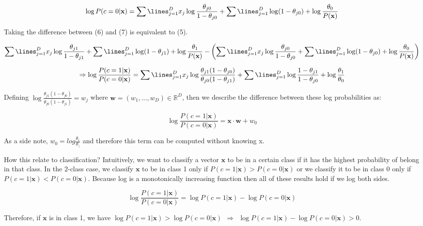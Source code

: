 \begin{equation}
\log P(c = 0 | \mathbf{x}) = \sum\lines_{j=1}^D x_j \log \frac{ \theta_{j0}}{1 - \theta_{j0}} + \sum\lines_{j=1}^D \log(1 - \theta_{j0}) +  \log \frac{\theta_0}{P(\mathbf{x})} 
\end{equation}

Taking the difference between (6) and (7) is equivalent to (5). 

$$
\sum\lines_{j=1}^D x_j \log \frac{ \theta_{j1}}{1 - \theta_{j1}} + 
\sum\lines_{j=1}^D \log(1 - \theta_{j1}) +  \log \frac{\theta_1}{P(\mathbf{x})} - \left( \sum\lines_{j=1}^D x_j \log \frac{ \theta_{j0}}{1 - \theta_{j0}} + \sum\lines_{j=1}^D \log(1 - \theta_{j0}) +  \log \frac{\theta_0}{P(\mathbf{x})} \right)
$$

$$
\Rightarrow \log \frac{  P( c = 1 | \mathbf{x})}{P( c = 0 | \mathbf{x})} = 
\sum\lines_{j=1}^D x_j \log \frac{ \theta_{j1} ( 1 - \theta_{j0}) }{ \theta_{j0}  (1 - \theta_{j1} ) } + 
\sum\lines_{j=1}^D \log \frac{ 1 - \theta_{j1} }{ 1 - \theta_{j0}  } +
 \log \frac{\theta_1}{\theta_0}
$$

Defining $ \log \frac{ \theta_{j1} ( 1 - \theta_{j0}) }{ \theta_{j0}  (1 - \theta_{j1} ) } = w_j $ where $\mathbf{w} = ( w_1, \dots, w_D) \in \mathbb{R}^D$, then we describe the difference between these log probabilities as:  

\begin{equation}
\log \frac{  P( c = 1 | \mathbf{x})}{P( c = 0 | \mathbf{x})} = 
\mathbf{x} \cdot \mathbf{w} + w_0
\end{equation}

As a side note, $w_0 = log \frac{\theta_1}{\theta_)}$ and therefore this term can be computed without knowing x. 

How this relate to classification?  Intuitively, we want to classify a vector $\mathbf{x}$ to be in a certain class if it has the highest probability of belong in that class.  In the 2-class case, we classify $\mathbf{x}$ to be in class 1 only if $P( c = 1| \mathbf{x}) > P( c = 0 | \mathbf{x}) $  or we classify it to be in class 0 only if $P( c = 1| \mathbf{x}) < P( c = 0 | \mathbf{x}) $. Because log is a monotonically increasing function then all of these results hold if we log both sides.  


$$
\log \frac{  P( c = 1 | \mathbf{x})}{P( c = 0 | \mathbf{x})} = \log P( c = 1 | \mathbf{x}) - \log P( c = 0 | \mathbf{x})
$$

Therefore, if $\mathbf{x}$ is in class 1, we have $ \log P( c = 1| \mathbf{x}) > \log P( c = 0 | \mathbf{x})  ~~ \Rightarrow ~~ \log P( c = 1| \mathbf{x}) - \log P( c = 0 | \mathbf{x}) > 0 $.  

